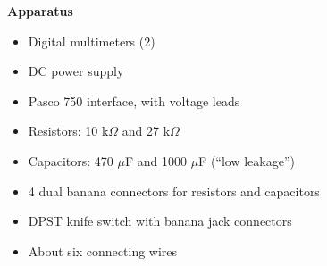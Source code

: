 \makelabheader %

\vspace{0.1in}
\textbf{Apparatus}
\vspace{-\parskip} 
\begin{itemize}[nosep]%
\item Digital multimeters (2) 
\item DC power supply 
\item Pasco 750 interface, with voltage leads
\item Resistors: 10 k$\Omega$ and 27 k$\Omega$
\item Capacitors: 470 $\mu$F and 1000 $\mu$F (``low leakage'')
\item 4 dual banana connectors for resistors and capacitors
\item DPST knife switch with banana jack connectors
\item About six connecting wires
\end{itemize}

